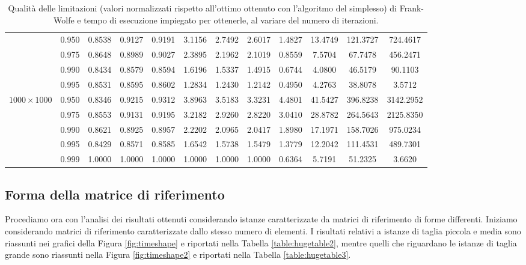 \begin{landscape}
\begin{table}[!h]
\begin{tabularx}{665.19638pt}{cccccccccccc}
        & 0.950 & 0.8538 & 0.9127 & 0.9191 & 3.1156 & 2.7492 & 2.6017 & 1.4827 & 13.4749 & 121.3727 & 724.4617 \\
        & 0.975 & 0.8648 & 0.8989 & 0.9027 & 2.3895 & 2.1962 & 2.1019 & 0.8559 & 7.5704 & 67.7478 & 456.2471 \\
        & 0.990 & 0.8434 & 0.8579 & 0.8594 & 1.6196 & 1.5337 & 1.4915 & 0.6744 & 4.0800 & 46.5179 & 90.1103 \\
        & 0.995 & 0.8531 & 0.8595 & 0.8602 & 1.2834 & 1.2430 & 1.2142 & 0.4950 & 4.2763 & 38.8078 & 3.5712 \\
        \midrule
        \( 1000\times 1000 \)
        & 0.950 & 0.8346 & 0.9215 & 0.9312 & 3.8963 & 3.5183 & 3.3231 & 4.4801 & 41.5427 & 396.8238 & 3142.2952 \\
        & 0.975 & 0.8553 & 0.9131 & 0.9195 & 3.2182 & 2.9260 & 2.8220 & 3.0410 & 28.8782 & 264.5643 & 2125.8350 \\
        & 0.990 & 0.8621 & 0.8925 & 0.8957 & 2.2202 & 2.0965 & 2.0417 & 1.8980 & 17.1971 & 158.7026 & 975.0234 \\
        & 0.995 & 0.8429 & 0.8571 & 0.8585 & 1.6542 & 1.5738 & 1.5479 & 1.3779 & 12.2042 & 111.4531 & 489.7301 \\
        & 0.999 & 1.0000 & 1.0000 & 1.0000 & 1.0000 & 1.0000 & 1.0000 & 0.6364 & 5.7191 & 51.2325 & 3.6620 \\
        \bottomrule
    \end{tabularx}
    \caption{Qualità delle limitazioni (valori normalizzati rispetto all'ottimo ottenuto con l'algoritmo del simplesso)
    di Frank-Wolfe e tempo di esecuzione impiegato per ottenerle, al variare del numero di iterazioni.}
    \label{table:timesize1}
\end{table}
\end{landscape}

\subsection{Forma della matrice di riferimento}

Procediamo ora con l'analisi dei risultati ottenuti considerando istanze caratterizzate da matrici di riferimento di
forme differenti. Iniziamo considerando matrici di riferimento caratterizzate dallo stesso numero di elementi. I
risultati relativi a istanze di taglia piccola e media sono riassunti nei grafici della Figura \ref{fig:timeshape} e
riportati nella Tabella \ref{table:hugetable2}, mentre quelli che riguardano le istanze di taglia grande sono riassunti
nella Figura \ref{fig:timeshape2} e riportati nella Tabella \ref{table:hugetable3}.

